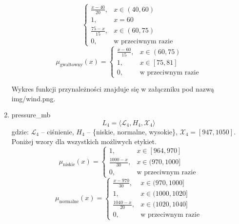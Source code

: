 \documentclass{article}
\begin{document}
\begin{enumerate}
\begin{equation}
                    \begin{cases}
                    \frac{x - 40}{20}, & x \in (40, 60) \\
                    1, & x = 60 \\
                    \frac{75 - x}{15}, & x \in (60, 75) \\
                    0, & \text{w przeciwnym razie}
                    \end{cases}
              \end{equation}
              \begin{equation}
                    \mu_{\text{gwałtowny}}(x) =
                    \begin{cases}
                    \frac{x - 60}{15}, & x \in (60, 75) \\
                    1, & x \in [75, 81] \\
                    0, & \text{w przeciwnym razie}
                    \end{cases}
              \end{equation}

Wykres funkcji przynależności znajduje się w załączniku pod nazwą img/wind.png.
              
    \item pressure\_mb
        \begin{equation}
            L_4 = \langle \mathcal{L}_4, H_4, \mathcal{X}_4 \rangle
        \end{equation}
        gdzie: $\mathcal{L}_4$ – ciśnienie, $H_4$ – \{niskie, normalne, wysokie\}, $\mathcal{X}_4 = [947, 1050]$. \\
        Poniżej wzory dla wszystkich możliwych etykiet.
                \begin{equation}
                    \mu_{\text{niskie}}(x) =
                    \begin{cases}
                    1, & x \in [964, 970] \\
                    \frac{1000 - x}{30}, & x \in (970, 1000] \\
                    0, & \text{w przeciwnym razie}
                    \end{cases}
              \end{equation}
                \begin{equation}
                   \mu_{\text{normalne}}(x) =
                    \begin{cases}
                    \frac{x - 970}{30}, & x \in (970, 1000] \\
                    1, & x \in (1000, 1020] \\
                    \frac{1040 - x}{20}, & x \in (1020, 1040] \\
                    0, & \text{w przeciwnym razie}
                    \end{cases}
                \end{equation}


\end{enumerate}
\end{document}
